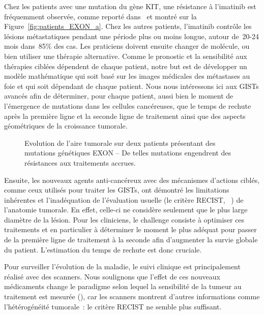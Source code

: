 \documentclass[main.tex]{subfiles}
\begin{document}
Chez les patients avec une mutation du gène KIT, une résistance à l'imatinib est  fréquemment observée, comme reporté dans~\cite{Blay2011} et montré sur la Figure~\ref{fig:patients_EXON_a}. 
Chez les autres patients, l'imatinib contrôle les lésions métastatiques pendant une période plus ou moins longue, autour de~20-24 mois dans~85\% des cas. 
Les praticiens doivent ensuite changer de molécule, ou bien utiliser une thérapie alternative. 
Comme le pronostic et la sensibilité aux thérapies ciblées dépendent de chaque patient, notre but est de développer un modèle mathématique qui soit basé sur les images médicales des métastases au foie et qui soit dépendant de chaque patient. 
Nous nous intéressons ici aux GISTs avancés afin de déterminer, pour chaque patient, aussi bien le moment de l'émergence de mutations dans les cellules cancéreuses, que le temps de rechute après la première ligne et la seconde ligne de traitement ainsi que des aspects géométriques de la croissance tumorale.

\begin{figure}
\hfill
{}
\caption{\label{fig:patients_EXON}Evolution de l'aire tumorale sur deux patients présentant des mutations génétiques EXON -- De telles mutations engendrent des résistances aux traitements accrues.}
\end{figure}


Ensuite, les nouveaux agents anti-cancéreux avec des mécanismes d'actions ciblés, comme ceux utilisés pour traiter les GISTs, ont démontré les limitations inhérentes et l'inadéquation de  l'évaluation usuelle (\ie le critère RECIST, \cf~\cite{suzuki2008}) de l'anatomie tumorale. En effet, celle-ci ne considère seulement que le plus large diamètre de la lésion. 
Pour les cliniciens, le challenge consiste à optimiser ces traitements et en particulier à déterminer le moment le plus adéquat pour passer de la première ligne de traitement à la seconde afin d'augmenter la survie globale du patient. L'estimation du temps de rechute est donc cruciale.


Pour surveiller l'évolution de la maladie, le suivi clinique est principalement réalisé avec des scanners. 
Nous soulignons que l'effet de ces nouveaux médicaments change le paradigme selon lequel la sensibilité de la tumeur au traitement est mesurée (\cf \cite{schramm2013}), car les scanners montrent d'autres informations comme l'hétérogénéité tumorale~: le critère RECIST ne semble plus suffisant.
\end{document}
